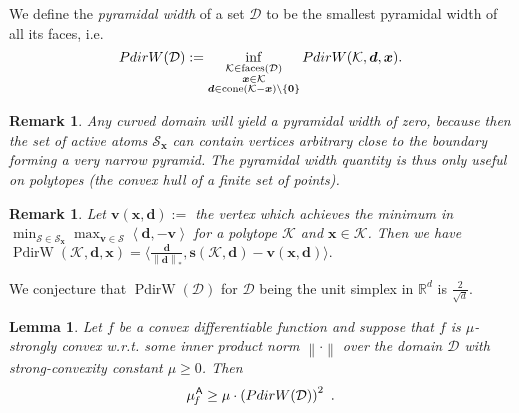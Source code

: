 \documentclass{article} %
\newtheorem{lemma}[definition]{Lemma}
\newtheorem{remark}[definition]{Remark}
\providecommand{\norm}[1]{\left\lVert#1\right\rVert}
\providecommand{\dualnorm}[1]{\norm{#1}_*}
\newcommand{\R}{\mathbb{R}}
\newcommand{\domain}{\mathcal{D}}
\newcommand{\away}{{\hspace{0.06em}\textsf{A}}}
\newcommand{\strongConvMFW}{\mu_{\hspace{-0.08em}f}^\away}
\newcommand{\x}{\bm{x}}
\newcommand{\s}{\bm{s}}
\newcommand{\dd}{\bm{d}}
\newcommand{\vv}{\bm{v}} %
\renewcommand{\S}{\mathcal{S}}
\newcommand{\PdirW}{\mathop{PdirW}}
\newcommand{\innerProd}[2]{\left\langle #1 , #2 \right\rangle}
\newcommand{\Kface}{\mathcal{K}}
\newcommand{\0}{\mathbf{0}} %
\begin{document}
We define the \emph{pyramidal width} of a set $\domain$ to be the smallest pyramidal width of all its faces, i.e.\vspace{-1mm}
\begin{equation} \label{eq:PdirW}
\PdirW(\domain) := \displaystyle \inf_{\substack{\Kface \in \textrm{faces}(\domain) \\
												  \x \in \Kface \\
												  \dd \in \text{cone}(\Kface-\x) \setminus \{\0\}} 
                                   } \PdirW(\Kface,\dd, \x) .    \vspace{-1mm}                             
\end{equation}
%

\begin{remark}
Any curved domain will yield a pyramidal width of zero, because then the set of active atoms $\S_{\x}$ can contain vertices arbitrary close to the boundary forming a very narrow pyramid. The pyramidal width quantity is thus only useful on polytopes (the convex hull of a finite set of points). %
\end{remark}

%
%
%
%
%
%

%
%
%
%
%

%

%




\begin{remark} \label{thm:PdirWproperty}
Let $ \vv(\x, \dd) :=$ the vertex which achieves the minimum in $\min_{\S \in \S_{\x}} \max_{\vv \in \S } \innerProd{\dd}{-\vv}$ for a polytope $\Kface$ and $\x \in \Kface$. Then we have
$
	\PdirW(\Kface,\dd, \x) = \big\langle \frac{\dd}{\dualnorm{\dd}} , \s(\Kface,\dd) - \vv(\x, \dd) \big\rangle.
$\vspace{-3mm}
\end{remark}
We conjecture that $\PdirW(\domain)$ for $\domain$ being the unit simplex in $\R^d$ is $\frac2{\sqrt{d}}$.

\begin{lemma} \label{lem:muFdirWinterpretation}
Let $f$ be a convex differentiable function and suppose that $f$ is $\mu$-\emph{strongly convex} w.r.t. some \emph{inner product norm} $\norm{\cdot}$ over the domain $\domain$ with strong-convexity constant $\mu \geq 0$. Then\vspace{-1mm}
\[
\strongConvMFW \geq \mu \cdot \left( \PdirW(\domain) \right)^2 \ .
\] 
\end{lemma}

\vspace{-2mm}
%
\end{document}
